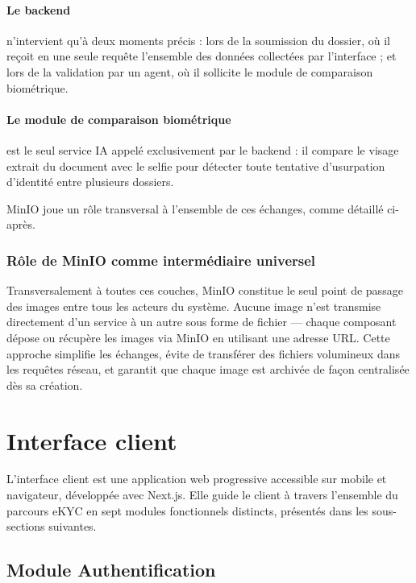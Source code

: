 \paragraph{Le backend}
n'intervient qu'à deux moments précis : lors de la soumission du dossier, où il reçoit en une seule requête l'ensemble des données collectées par l'interface ; et lors de la validation par un agent, où il sollicite le module de comparaison biométrique.

\paragraph{Le module de comparaison biométrique}
est le seul service IA appelé exclusivement par le backend : il compare le visage extrait du document avec le selfie pour détecter toute tentative d'usurpation d'identité entre plusieurs dossiers.

MinIO joue un rôle transversal à l'ensemble de ces échanges, comme détaillé ci-après.

\subsubsection{Rôle de MinIO comme intermédiaire universel}

Transversalement à toutes ces couches, MinIO constitue le seul point de passage des images entre tous les acteurs du système. Aucune image n'est transmise directement d'un service à un autre sous forme de fichier — chaque composant dépose ou récupère les images via MinIO en utilisant une adresse URL. Cette approche simplifie les échanges, évite de transférer des fichiers volumineux dans les requêtes réseau, et garantit que chaque image est archivée de façon centralisée dès sa création.

\section{Interface client}
\label{sec:interface-client}

L'interface client est une application web progressive accessible sur mobile et navigateur, développée avec Next.js. Elle guide le client à travers l'ensemble du parcours eKYC en sept modules fonctionnels distincts, présentés dans les sous-sections suivantes.

\subsection{Module Authentification}
\label{subsec:ui-auth}


